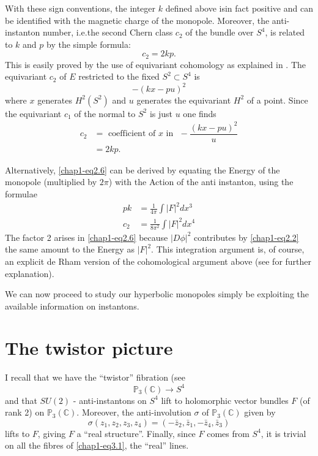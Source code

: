With these sign conventions, the integer $k$ defined above
is\pageoriginale in fact positive and can be identified with the
magnetic charge of the monopole. Moreover, the anti-instanton number,
i.e.\@ the second Chern class $c_{2}$ of the bundle over $S^{4}$, is
related to $k$ and $p$ by the simple formula:
\begin{equation}
c_{2}=2kp.\label{chap1-eq2.6}
\end{equation}
This is easily proved by the use of equivariant cohomology as
explained in \cite{chap1-key3}. The equivariant $c_{2}$ of $E$
restricted to the fixed $S^{2}\subset S^{4}$ is
$$
-(kx-pu)^{2}
$$
where $x$ generates $H^{2}(S^{2})$ and $u$ generates the equivariant
$H^{2}$ of a point. Since the equivariant $c_{1}$ of the normal to
$S^{2}$ is just $u$ one finds
\begin{align*}
c_{2} &= \text{~coefficient of $x$ in~ }
-\dfrac{(kx-pu)^{2}}{u}\\[4pt]
&= 2kp.
\end{align*}

Alternatively, \eqref{chap1-eq2.6} can be derived by equating the
Energy of the monopole (multiplied by $2\pi$) with the Action of the
anti instanton, using the formulae
\begin{align*}
pk &= \frac{1}{4\pi}\int |F|^{2}dx^{3}\\[4pt]
c_{2} &= \frac{1}{8\pi^{2}}\int |F|^{2}dx^{4}
\end{align*}
The factor 2 arises in \eqref{chap1-eq2.6} because $|D\phi|^{2}$
contributes by \eqref{chap1-eq2.2} the same amount to the Energy as
$|F|^{2}$. This integration argument is, of course, an explicit de
Rham version of the cohomological argument above (see
\cite{chap1-key3} for further explanation).

We can now proceed to study our hyperbolic monopoles simply be
exploiting the available information on instantons. 

\section{The twistor picture}\label{chap1-sec3}\pageoriginale


I recall that we have the ``twistor'' fibration (see \cite{chap1-key1}
\begin{equation}
\mathbb{P}_{3}(\mathbb{C})\to S^{4}\label{chap1-eq3.1}
\end{equation}
and that $SU(2)$ - anti-instantons on $S^{4}$ lift to holomorphic
vector bundles $F$ (of rank 2) on
$\mathbb{P}_{3}(\mathbb{C})$. Moreover, the anti-involution $\sigma$
of $\mathbb{P}_{3}(\mathbb{C})$ given by
$$
\sigma(z_{1},z_{2},z_{3},z_{4})=(-\bar{z}_{2},\bar{z}_{1},-\bar{z}_{4},\bar{z}_{3}) 
$$
lifts to $F$, giving $F$ a ``real structure''. Finally, since $F$
comes from $S^{4}$, it is trivial on all the fibres of
\eqref{chap1-eq3.1}, the ``real'' lines.

